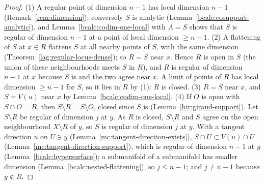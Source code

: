 \begin{proof}
\upstreamleanok
(1) A regular point of dimension \(n-1\) has local dimension \(n-1\) (Remark~\ref{rem:dimension}); conversely \(S\) is analytic
(Lemma~\ref{bcalc:cosupport-analytic}), and Lemma~\ref{bcalc:codim-one-local} with \(A=S\) shows that \(S\) is regular of dimension \(n-1\) at a point of
local dimension \(\ge n-1\). (2) A flattening of \(S\) at \(x\in R\) flattens \(S\) at all nearby points of \(S\), with the same dimension
(Theorem~\ref{lag:regular-locus-dense}); so \(R=S\) near \(x\). Hence \(R\) is open in \(S\) (the union of these neighbourhoods meets \(S\) in \(R\)), and
\(R\) is regular of dimension \(n-1\) at \(x\) because \(S\) is and the two agree near \(x\). A limit of points of \(R\) has local dimension \(\ge n-1\) for
\(S\), so it lies in \(R\) by (1): \(R\) is closed. (3) \(R=S\) near \(x\), and \(S=V(u)\) near \(x\) by Lemma~\ref{bcalc:codim-one-local}.
(4) If \(O\) is open with \(S\cap O=R\), then \(S\setminus R=S\setminus O\), closed since \(S\) is (Lemma~\ref{hir:giraud-support}). Let \(S\setminus R\) be
regular of dimension \(j\) at \(y\). As \(R\) is closed, \(S\setminus R\) and \(S\) agree on the open neighbourhood \(X\setminus R\) of \(y\), so \(S\) is regular
of dimension \(j\) at \(y\). With a tangent direction \(u\) on \(U\ni y\) (Lemma~\ref{mc:tangent-direction-exists}), \(S\cap U\subset V(u)\cap U\)
(Lemma~\ref{mc:tangent-direction-support}), which is regular of dimension \(n-1\) at \(y\) (Lemma~\ref{bcalc:hypersurface}); a submanifold of a
submanifold has smaller dimension (Lemma~\ref{bcalc:nested-flattening}), so \(j\le n-1\); and \(j\ne n-1\) because \(y\notin R\).
\end{proof}

